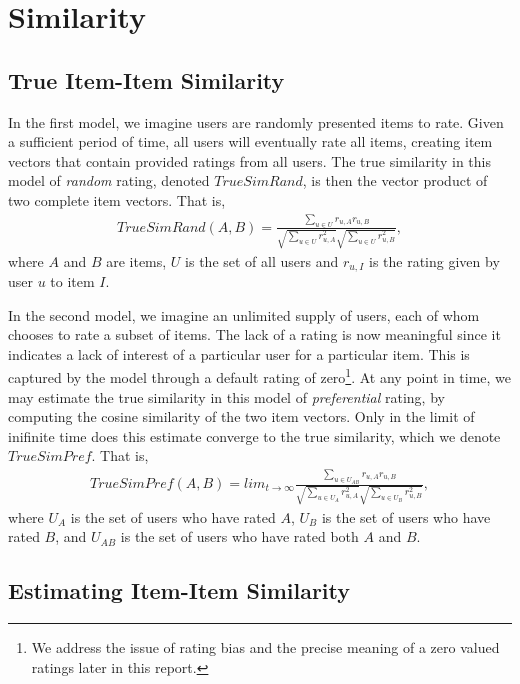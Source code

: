 \documentclass[11pt]{article}
\begin{document}
\section*{Similarity}
\subsection*{True Item-Item Similarity}

In the first model, we imagine users are randomly presented items to rate. Given
a sufficient period of time, all users will eventually rate all items, creating
item vectors that contain provided ratings from all users. The true similarity
in this model of {\em random} rating, denoted $TrueSimRand$, is then the vector
product of two complete item vectors. That is,
\begin{align}
TrueSimRand(A, B) = \frac{\sum\limits_{u\in U}
r_{u,A}r_{u,B}}{\sqrt{\sum\limits_{u\in U} r_{u,A}^2}
\sqrt{\sum\limits_{u\in U} r_{u,B}^2}},
\end{align}
where $A$ and $B$ are items, $U$ is the set of all users and $r_{u,I}$ is the 
rating given by user $u$ to item $I$.

In the second model, we imagine an unlimited supply of users, each of whom
chooses to rate a subset of items. The lack of a rating is now meaningful since
it indicates a lack of interest of a particular user for a particular item. This
is captured by the model through a default rating of zero\footnote{We address
the issue of rating bias and the precise meaning of a zero valued ratings later
in this report.}. At any point in time, we may estimate the true similarity in
this model of {\em preferential} rating, by computing the cosine similarity of
the two item vectors. Only in the limit of inifinite time does this estimate
converge to the true similarity, which we denote $TrueSimPref$.  That is,
\begin{align}
TrueSimPref(A, B) = lim_{t\to\infty}\frac{\sum\limits_{u\in U_{AB}}
r_{u,A}r_{u,B}}{\sqrt{\sum\limits_{u\in U_A} r_{u,A}^2}
\sqrt{\sum\limits_{u\in U_B} r_{u,B}^2}},
\end{align}
where $U_A$ is the set of users who have rated $A$, $U_B$ is the set of users
who have rated $B$, and $U_{AB}$ is the set of users who have rated both $A$ and
$B$.

\subsection*{Estimating Item-Item Similarity}
\end{document}
